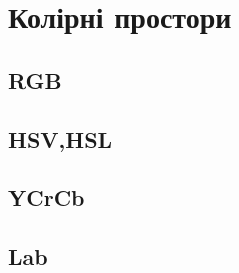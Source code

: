 \section{Колірні простори}
\subsection{RGB}
\subsection{HSV,HSL}
\subsection{YCrCb}
\subsection{Lab}